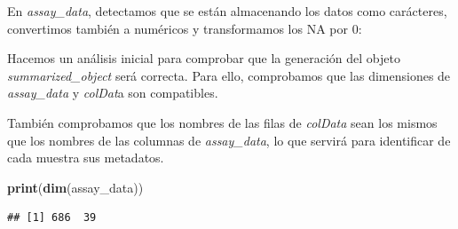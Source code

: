 \documentclass[
]{article}
\newenvironment{Shaded}{\begin{snugshade}}{\end{snugshade}}
\newcommand{\AttributeTok}[1]{\textcolor[rgb]{0.13,0.29,0.53}{#1}}
\newcommand{\CommentTok}[1]{\textcolor[rgb]{0.56,0.35,0.01}{\textit{#1}}}
\newcommand{\DecValTok}[1]{\textcolor[rgb]{0.00,0.00,0.81}{#1}}
\newcommand{\FunctionTok}[1]{\textcolor[rgb]{0.13,0.29,0.53}{\textbf{#1}}}
\newcommand{\NormalTok}[1]{#1}
\newcommand{\OtherTok}[1]{\textcolor[rgb]{0.56,0.35,0.01}{#1}}
\newcommand{\SpecialCharTok}[1]{\textcolor[rgb]{0.81,0.36,0.00}{\textbf{#1}}}
\begin{document}
En \emph{assay\_data}, detectamos que se están almacenando los datos
como carácteres, convertimos también a numéricos y transformamos los NA
por 0:

\begin{Shaded}
\end{Shaded}

Hacemos un análisis inicial para comprobar que la generación del objeto
\emph{summarized\_object} será correcta. Para ello, comprobamos que las
dimensiones de \emph{assay\_data} y \emph{colDat}a son compatibles.

También comprobamos que los nombres de las filas de \emph{colData} sean
los mismos que los nombres de las columnas de \emph{assay\_data}, lo que
servirá para identificar de cada muestra sus metadatos.

\begin{Shaded}
\begin{Highlighting}[]
\FunctionTok{print}\NormalTok{(}\FunctionTok{dim}\NormalTok{(assay\_data))}
\end{Highlighting}
\end{Shaded}

\begin{verbatim}
## [1] 686  39
\end{verbatim}
\end{document}
